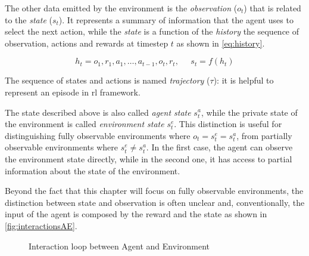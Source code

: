The other data emitted by the environment is the \textit{observation} ($o_t$) that is related to the \textit{state} ($s_t$). It represents a summary of information that the agent uses to select the next action, while the \textit{state} is a function of the \textit{history} the sequence of observation, actions and rewards at timestep $t$ as shown in \vref{eq:history}.

\begin{equation}\label{eq:history}
h_t = o_1, r_1, a_1, \dots, a_{t-1}, o_{t}, r_t, \;\;\;\;\; s_t = f(h_t)
\end{equation}

The sequence of states and actions is named \textit{trajectory} ($\tau$): it is helpful to represent an episode in \acrfull{rl} framework.

The state described above is also called \textit{agent state} $s_t^a$, while the private state of the environment is called \textit{environment state} $s_t^e$. This distinction is useful for distinguishing fully observable environments where $o_t = s_t^e = s_t^a$, from partially observable environments where $s_t^e \neq s_t^a$.
In the first case, the agent can observe the environment state directly, while in the second one, it has access to partial information about the state of the environment.

Beyond the fact that this chapter will focus on fully observable environments, the distinction between state and observation is often unclear and, conventionally, the input of the agent is composed by the reward and the state as shown in \vref{fig:interactionsAE}.

\begin{figure}
	\centering
	\caption[Interaction loop between Agent and Environment]{Interaction loop between Agent and Environment}
	\label{fig:interactionsAE}
\end{figure}


